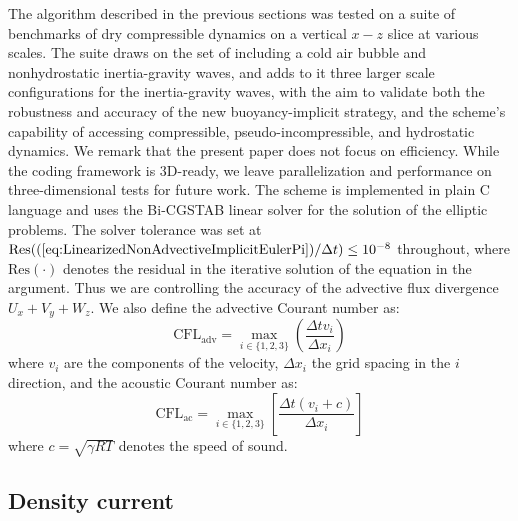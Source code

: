 \documentclass{ametsoc}
\newcommand{\sblue}[1]{\textcolor{sblue}{#1}}
\newcommand{\revision}[1]{\sblue{#1}}
\theoremstyle{definition}
\newcommand{\eq}[1]{(\ref{#1})}
\newcommand{\dt}{\Delta t}
\newcommand{\dx}{{\Delta x}}
\begin{document}
The algorithm described in the previous sections was tested on a suite of benchmarks of dry compressible dynamics on a vertical $x-z$ slice at various scales. The suite draws on the set of \cite{Benacchio2014,BenacchioEtAl2014} including a cold air bubble and nonhydrostatic inertia-gravity waves, and adds to it three larger scale configurations for the inertia-gravity waves, with the aim to validate both the robustness and accuracy of the new buoyancy-implicit strategy, and the scheme's capability of accessing compressible, pseudo-incompressible, and hydrostatic dynamics. We remark that the present paper does not focus on efficiency. While the coding framework is 3D-ready, we leave parallelization and performance on three-dimensional tests for future work. The scheme is implemented in plain C language and uses the Bi-CGSTAB linear solver \citep{Vandervorst1992} for the solution of the elliptic problems. The solver tolerance was set at 
\revision{$\text{Res}(\eq{eq:LinearizedNonAdvectiveImplicitEulerPi}/\Delta t) \leq 10^{-8}$ 
throughout, where $\text{Res}(\cdot)$ denotes the residual in the iterative solution of the equation in the argument. Thus we are controlling the accuracy of the advective flux divergence $U_x+V_y+W_z$.} We also define the advective Courant number as:
%
\begin{equation}
\textrm{CFL}_\textrm{adv} = \max\limits_{i \in \{1,2,3\}}\left(\frac{\dt v_i}{\dx_i}\right)
\end{equation}
%
where $v_i$ are the components of the velocity, $\dx_i$ the grid spacing in the $i$ direction, and the acoustic Courant number as:
%
\begin{equation}
\textrm{CFL}_\textrm{ac} = \max\limits_{i \in \{1,2,3\}}\left[\frac{\dt (v_i+c)}{\dx_i}\right]
\end{equation}
%
where $c=\sqrt{\gamma RT}$ denotes the speed of sound.

\subsection{Density current}
\end{document}
